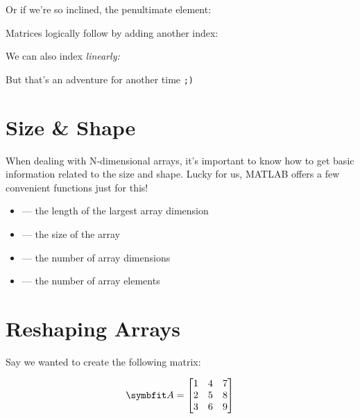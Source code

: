 \documentclass{article}
\begin{document}
Or if we're so inclined, the penultimate element:


Matrices logically follow by adding another index:


\begin{minipage}{\textwidth}
	We can also index \emph{linearly:}

	\vspace{1em}

\end{minipage}

But that's an adventure for another time \texttt{;)}

\section{Size \& Shape}

When dealing with N-dimensional arrays, it's important to know how to
get basic information related to the size and shape.  Lucky for us,
MATLAB offers a few convenient functions just for this!

\begin{itemize}
	\item
		 --- the length of the largest
		array dimension

	\item
		 --- the size of the array

	\item
		 --- the number of array dimensions

	\item
		 --- the number of array elements
\end{itemize}

\section{Reshaping Arrays}

Say we wanted to create the following matrix:

\begin{equation}
	\mat{A}
	=
	\begin{bmatrix}
		1 & 4 & 7\\
		2 & 5 & 8\\
		3 & 6 & 9\\
	\end{bmatrix}
\end{equation}
\end{document}
